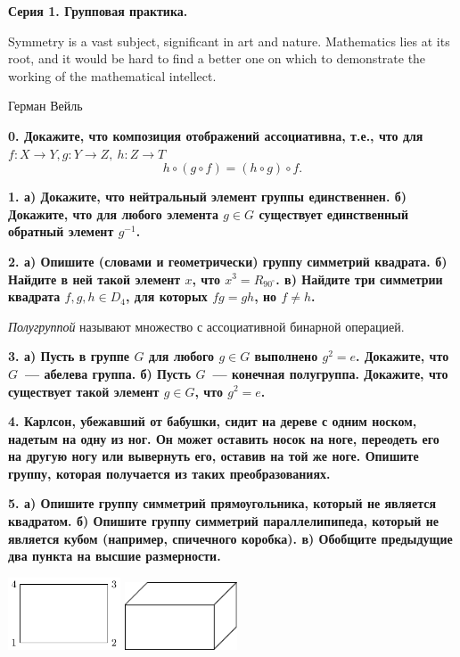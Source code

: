 \documentclass[12pt]{article}
\begin{document}
\centerline{\bf{Серия 1. Групповая практика. }}

	\epigraph{Symmetry is a vast subject, significant in art and nature. Mathematics lies at its root, and it would be hard to find a better one on which to demonstrate the working of the mathematical intellect.}{Герман Вейль}

	\bf{0.} Докажите, что композиция отображений ассоциативна, т.е., что для $f \colon X \to Y, g \colon Y \to Z, \ h \colon Z \to T$
	\[
		h \circ (g \circ f) = (h \circ g) \circ f.
	\]

	\bf{1.} а) Докажите, что нейтральный элемент группы единственнен. б) Докажите, что для любого элемента $g \in G$ существует единственный обратный элемент $g^{-1}$. 

	\bf{2.} а) Опишите (словами и геометрически) группу симметрий квадрата. б) Найдите в ней такой элемент $x$, что $x^3 = R_{90^{\circ}}$. в) Найдите три симметрии квадрата $f, g, h \in D_{4}$, для которых $fg = gh$, но $f \neq h$.

	\begin{definition} 
		\emph{Полугруппой} называют множество с ассоциативной бинарной операцией. 
	\end{definition}

	\bf{3.} а)  Пусть в группе $G$ для любого $g \in G$ выполнено $g^2 = e$. Докажите, что $G$~--- абелева группа.  б) Пусть $G$~--- конечная полугруппа. Докажите, что существует такой элемент $g \in G$, что $g^2 = e$.

	\bf{4.} Карлсон, убежавший от бабушки, сидит на дереве с одним носком, надетым на одну из ног. Он может оставить носок на ноге, переодеть его на другую ногу или вывернуть его, оставив на той же ноге. Опишите группу, которая получается из таких преобразованиях. 

	\bf{5.} а) Опишите группу симметрий прямоугольника, который не является квадратом. б) Опишите группу симметрий параллелипипеда, который не является кубом (например, спичечного коробка). в) Обобщите предыдущие два пункта на высшие размерности. 

	\begin{center}
	\begin{minipage}{6in}
		\includegraphics[width=0.25\textwidth]{print/pic/pic_1.pdf}
		\hspace{10mm}
		\includegraphics[width=0.25\textwidth]{print/pic/pic_2.pdf}
	\end{minipage}
	\end{center} 



	
\end{document}
